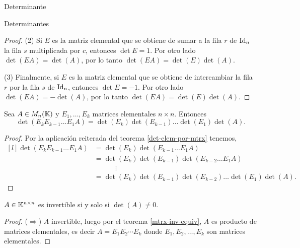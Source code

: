 \begin{chapter}{Determinante}
\begin{section}{Determinantes}
\begin{proof}
                 
                 (2) Si $E$ es la matriz elemental que se obtiene de sumar a la fila $r$ de $\operatorname{Id}_n$  la fila $s$ multiplicada por $c$, entonces $\det E =1$. Por  otro lado  $\det(EA) = \det(A)$, por lo tanto  $\det(EA) = \det(E)\det(A)$.
                 
                 (3) Finalmente, si $E$ es la matriz elemental que se obtiene de intercambiar la fila $r$ por la fila $s$ de $\operatorname{Id}_n$, entonces $\det E=-1$. Por  otro lado  $\det(EA) = -\det(A)$, por lo tanto  $\det(EA) = \det(E)\det(A)$.
             \end{proof}
             
             \begin{corolario}\label{coro-det-prod-elem-mtrx}
                 Sea $A  \in M_n(\mathbb K)$ y $E_1,\ldots,E_k$ matrices elementales $n \times n$. Entonces
                 \begin{equation*}
                 \det (E_kE_{k-1}\ldots E_1A) = \det (E_k) \det (E_{k-1})\ldots \det (E_1) \det (A).
                 \end{equation*}  
             \end{corolario}
             \begin{proof}
                 Por  la aplicación reiterada del teorema \ref{det-elem-por-mtrx} tenemos, 
                 \begin{equation*}
                 \begin{matrix*}[l]
                 \det (E_kE_{k-1}\ldots E_1A) &= \det (E_k) \det(E_{k-1}\ldots E_1 A) \\
                 &= \det( E_k) \det(E_{k-1})\det(E_{k-2}\ldots E_1A) \\
                 &\qquad\quad \vdots \\
                 & = \det( E_k) \det(E_{k-1})\det(E_{k-2})\ldots \det(E_1) \det(A).
                 \end{matrix*}		
                 \end{equation*}
             \end{proof}
             
    
    
             \begin{teorema}\label{th-det-matriz-invertible}
                $A \in \mathbb K^{n \times n}$ es invertible si y solo si $\det(A) \ne 0$.
            \end{teorema}
            \begin{proof}
                ($\Rightarrow$)  $A$ invertible, luego por el  teorema \ref{mtrx-inv-equiv}, $A$ es producto de matrices elementales, es decir  $A = E_1 E_2 \cdots E_k$  donde $E_1, E_2, \ldots, E_k$ son matrices elementales. 
                

\end{proof}
\end{section}
\end{chapter}
